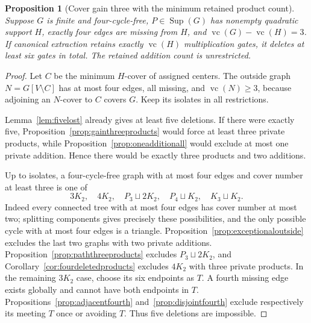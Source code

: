 \documentclass[11pt]{article}
\newcommand{\Sup}{\operatorname{Sup}}
\newcommand{\vc}{\operatorname{vc}}
\newtheorem{proposition}[theorem]{Proposition}
\theoremstyle{definition}
\theoremstyle{remark}
\begin{document}
\begin{proposition}[Cover gain three with the minimum retained product count]\label{prop:gainthreesix}
Suppose $G$ is finite and four-cycle-free, $P\in\Sup(G)$ has nonempty quadratic support $H$, exactly four edges are missing from $H$, and $\vc(G)-\vc(H)=3$. If canonical extraction retains exactly $\vc(H)$ multiplication gates, it deletes at least six gates in total. The retained addition count is unrestricted.
\end{proposition}
\begin{proof}
Let $C$ be the minimum $H$-cover of assigned centers. The outside graph $N=G[V\setminus C]$ has at most four edges, all missing, and $\vc(N)\geq3$, because adjoining an $N$-cover to $C$ covers $G$. Keep its isolates in all restrictions.

Lemma~\ref{lem:fivelost} already gives at least five deletions. If there were exactly five, Proposition~\ref{prop:gainthreeproducts} would force at least three private products, while Proposition~\ref{prop:oneadditionall} would exclude at most one private addition. Hence there would be exactly three products and two additions.

Up to isolates, a four-cycle-free graph with at most four edges and cover number at least three is one of
\[
 3K_2,\quad4K_2,\quad P_3\sqcup2K_2,\quad
 P_4\sqcup K_2,\quad K_3\sqcup K_2.
\]
Indeed every connected tree with at most four edges has cover number at most two; splitting components gives precisely these possibilities, and the only possible cycle with at most four edges is a triangle. Proposition~\ref{prop:exceptionaloutside} excludes the last two graphs with two private additions. Proposition~\ref{prop:paththreeproducts} excludes $P_3\sqcup2K_2$, and Corollary~\ref{cor:fourdeletedproducts} excludes $4K_2$ with three private products. In the remaining $3K_2$ case, choose its six endpoints as $T$. A fourth missing edge exists globally and cannot have both endpoints in $T$. Propositions~\ref{prop:adjacentfourth} and~\ref{prop:disjointfourth} exclude respectively its meeting $T$ once or avoiding $T$. Thus five deletions are impossible.
\end{proof}
\end{document}
